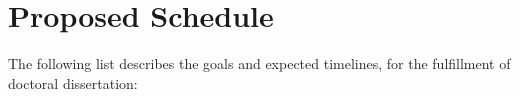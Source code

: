 %
%



\section{Proposed Schedule}

The following list describes the goals and expected timelines,
for the fulfillment of doctoral dissertation:

